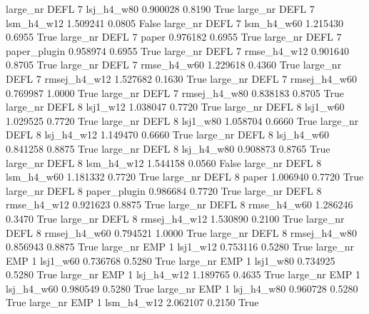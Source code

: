   large_nr     DEFL                 7   lsj_h4_w80    0.900028      0.8190    True
  large_nr     DEFL                 7   lsm_h4_w12    1.509241      0.0805   False
  large_nr     DEFL                 7   lsm_h4_w60    1.215430      0.6955    True
  large_nr     DEFL                 7        paper    0.976182      0.6955    True
  large_nr     DEFL                 7 paper_plugin    0.958974      0.6955    True
  large_nr     DEFL                 7  rmse_h4_w12    0.901640      0.8705    True
  large_nr     DEFL                 7  rmse_h4_w60    1.229618      0.4360    True
  large_nr     DEFL                 7 rmsej_h4_w12    1.527682      0.1630    True
  large_nr     DEFL                 7 rmsej_h4_w60    0.769987      1.0000    True
  large_nr     DEFL                 7 rmsej_h4_w80    0.838183      0.8705    True
  large_nr     DEFL                 8     lsj1_w12    1.038047      0.7720    True
  large_nr     DEFL                 8     lsj1_w60    1.029525      0.7720    True
  large_nr     DEFL                 8     lsj1_w80    1.058704      0.6660    True
  large_nr     DEFL                 8   lsj_h4_w12    1.149470      0.6660    True
  large_nr     DEFL                 8   lsj_h4_w60    0.841258      0.8875    True
  large_nr     DEFL                 8   lsj_h4_w80    0.908873      0.8765    True
  large_nr     DEFL                 8   lsm_h4_w12    1.544158      0.0560   False
  large_nr     DEFL                 8   lsm_h4_w60    1.181332      0.7720    True
  large_nr     DEFL                 8        paper    1.006940      0.7720    True
  large_nr     DEFL                 8 paper_plugin    0.986684      0.7720    True
  large_nr     DEFL                 8  rmse_h4_w12    0.921623      0.8875    True
  large_nr     DEFL                 8  rmse_h4_w60    1.286246      0.3470    True
  large_nr     DEFL                 8 rmsej_h4_w12    1.530890      0.2100    True
  large_nr     DEFL                 8 rmsej_h4_w60    0.794521      1.0000    True
  large_nr     DEFL                 8 rmsej_h4_w80    0.856943      0.8875    True
  large_nr      EMP                 1     lsj1_w12    0.753116      0.5280    True
  large_nr      EMP                 1     lsj1_w60    0.736768      0.5280    True
  large_nr      EMP                 1     lsj1_w80    0.734925      0.5280    True
  large_nr      EMP                 1   lsj_h4_w12    1.189765      0.4635    True
  large_nr      EMP                 1   lsj_h4_w60    0.980549      0.5280    True
  large_nr      EMP                 1   lsj_h4_w80    0.960728      0.5280    True
  large_nr      EMP                 1   lsm_h4_w12    2.062107      0.2150    True
